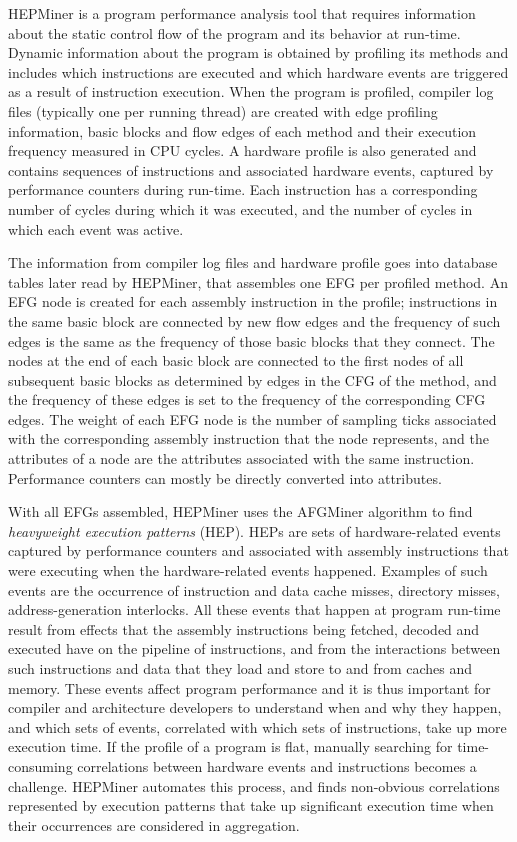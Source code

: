 HEPMiner is a program performance analysis tool that requires information about the static control flow of the program and its behavior at run-time. Dynamic information about the program is obtained by profiling its methods and includes which instructions are executed and which hardware events are triggered as a result of instruction execution. When the program is profiled, compiler log files (typically one per running thread) are created with edge profiling information, \ie basic blocks and flow edges of each method and their execution frequency measured in CPU cycles. A hardware profile is also generated and contains sequences of instructions and associated hardware events, captured by performance counters during run-time. Each instruction has a corresponding number of cycles during which it was executed, and the number of cycles in which each event was active. 

The information from compiler log files and hardware profile goes into database tables later read by HEPMiner, that assembles one EFG per profiled method. An EFG node is created for each assembly instruction in the profile; instructions in the same basic block are connected by new flow edges and the frequency of such edges is the same as the frequency of those basic blocks that they connect. The nodes at the end of each basic block are connected to the first nodes of all subsequent basic blocks as determined by edges in the CFG of the method, and the frequency of these edges is set to the frequency of the corresponding CFG edges. The weight of each EFG node is the number of sampling ticks associated with the corresponding assembly instruction that the node represents, and the attributes of a node are the attributes associated with the same instruction. Performance counters can mostly be directly converted into attributes. 

With all EFGs assembled, HEPMiner uses the AFGMiner algorithm to find \emph{heavyweight execution patterns} (HEP). HEPs are sets of hardware-related events captured by performance counters and associated with assembly instructions that were executing when the hardware-related events happened. Examples of such events are the occurrence of instruction and data cache misses, directory misses, address-generation interlocks. All these events that happen at program run-time result from effects that the assembly instructions being fetched, decoded and executed have on the pipeline of instructions, and from the interactions between such instructions and data that they load and store to and from caches and memory. These events affect program performance and it is thus important for compiler and architecture developers to understand when and why they happen, and which sets of events, correlated with which sets of instructions, take up more execution time. If the profile of a program is flat, manually searching for time-consuming correlations between hardware events and instructions becomes a challenge. HEPMiner automates this process, and finds non-obvious correlations represented by execution patterns that take up significant execution time when their occurrences are considered in aggregation.
